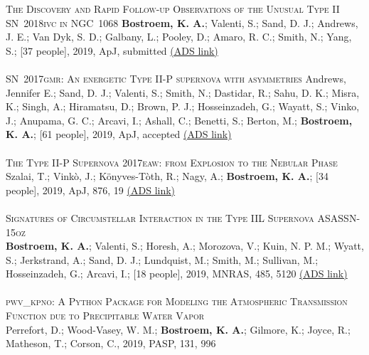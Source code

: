 
\vspace{-0.1in}  
\textsc{The Discovery and Rapid Follow-up Observations of the Unusual Type II SN~2018ivc in NGC~1068}
{\bf Bostroem, K. A.}; Valenti, S.; Sand, D. J.; Andrews, J. E.; Van Dyk, S. D.; Galbany, L.; Pooley, D.; Amaro, R. C.; Smith, N.; Yang, S.; [37 people], 2019, ApJ, submitted 
\color{blue}\href{https://ui.adsabs.harvard.edu/abs/2019arXiv190907304B/abstract}{(ADS link)}\color{black}\\
\\
\textsc{SN~2017gmr: An energetic Type II-P supernova with asymmetries}
Andrews, Jennifer E.; Sand, D. J.; Valenti, S.; Smith, N.; Dastidar, R.; Sahu, D. K.; Misra, K.; Singh, A.; Hiramatsu, D.; Brown, P. J.; Hosseinzadeh, G.; Wayatt, S.; Vinko, J.; Anupama, G. C.; Arcavi, I.; Ashall, C.; Benetti, S.; Berton, M.; \textbf{Bostroem, K. A.}; [61 people], 2019, ApJ, accepted
\color{blue}\href{https://ui.adsabs.harvard.edu/abs/2019arXiv190701013A/abstract} {(ADS link)}\color{black}\\
\\
\textsc{The Type II-P Supernova 2017eaw: from Explosion to the Nebular Phase}\\ 
Szalai, T.; Vink\`{o}, J.; K\"{o}nyves-T\`{o}th, R.; Nagy, A.; {\bf Bostroem, K. A.}; [34 people], 2019, ApJ, 876, 19
\color{blue}\href{https://ui.adsabs.harvard.edu/abs/2019ApJ...876...19S/abstract}{(ADS link)}\color{black}\\
\\
\textsc{Signatures of Circumstellar Interaction in the Type IIL Supernova ASASSN-15oz}\\ 
{\bf Bostroem, K. A.}; Valenti, S.; Horesh, A.; Morozova, V.; Kuin, N. P. M.; Wyatt, S.; Jerkstrand, A.; Sand, D. J.; Lundquist, M.; Smith, M.; Sullivan, M.; Hosseinzadeh, G.; Arcavi, I.;  [18 people], 2019, MNRAS, 485, 5120
\color{blue}\href{https://ui.adsabs.harvard.edu/abs/2019MNRAS.485.5120B/abstract}{(ADS link)}\color{black}\\
\\
\textsc{pwv\_kpno: A Python Package for Modeling the Atmospheric Transmission Function due to Precipitable Water Vapor}\\ 
Perrefort, D.; Wood-Vasey, W. M.; {\bf Bostroem, K. A.}; Gilmore, K.; Joyce, R.; Matheson, T.; Corson, C., 2019, PASP, 131, 996 
